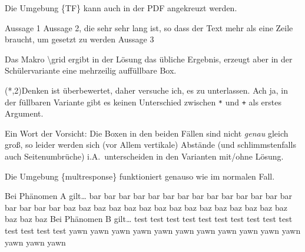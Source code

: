\documentclass[hyperworksheet]{drcschool}
\newcommand*{\cs}[1]{\textup{\ttfamily\textbackslash#1}}                        %
\newcommand*{\env}[1]{\textup{\ttfamily\{#1\}}}                                 %
\begin{document}
\begin{hyperworksheet}
Die Umgebung \env{TF} kann auch in der PDF angekreuzt werden.
\begin{TF}[.8\linewidth]
Aussage 1 \true
\midrule
Aussage 2, die sehr sehr lang ist, so dass der Text mehr als eine Zeile braucht, um gesetzt zu werden \false
\midrule
Aussage 3 \false
\end{TF}

\exercise[Grids]
Das Makro \cs{grid} ergibt in der Lösung das übliche Ergebnis, erzeugt aber in der Schülervariante
eine mehrzeilig auffüllbare Box.

\grid(*,2){Denken ist überbewertet, daher versuche ich, es zu unterlassen. Ach ja, in der füllbaren Variante gibt es keinen
Unterschied zwischen \texttt{*} und \texttt{+} als erstes Argument.}

\noindent
Ein Wort der Vorsicht: Die Boxen in den beiden Fällen sind nicht \emph{genau}
gleich groß, so leider werden
sich (vor Allem vertikale) Abstände (und schlimmstenfalls auch Seitenumbrüche) i.A.~unterscheiden
in den Varianten mit/ohne Lösung.

\easy{}
Die Umgebung \env{multresponse} funktioniert genauso wie im normalen Fall.
\begin{multresponse}
\question Bei Phänomen A gilt\ldots
\choice* bar bar bar bar bar bar bar bar bar bar bar bar bar bar bar bar bar bar
\choice* baz baz baz baz baz baz baz baz baz baz baz baz baz baz baz baz baz baz
\question Bei Phänomen B gilt\ldots
\choice* test test test test test test test test test test test test test test
\choice yawn yawn yawn yawn yawn yawn yawn yawn yawn yawn yawn yawn yawn yawn
\end{multresponse}


\end{hyperworksheet}
\end{document}
